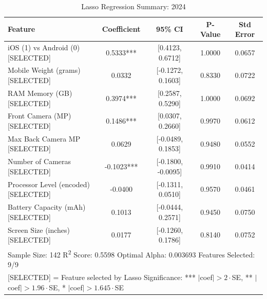 \documentclass[12pt]{article}
\begin{document}
\begin{table}[ht]
\centering
\caption{Lasso Regression Summary: 2024}
\begin{tabular}{lcccc}
\toprule
Feature & Coefficient & 95\% CI & P-Value & Std Error \\
\midrule
iOS (1) vs Android (0) [SELECTED] & 0.5333*** & {[0.4123, 0.6712]} & 1.0000 & 0.0657 \\
Mobile Weight (grams) [SELECTED] & 0.0332 & {[-0.1272, 0.1603]} & 0.8330 & 0.0722 \\
RAM Memory (GB) [SELECTED] & 0.3974*** & {[0.2587, 0.5290]} & 1.0000 & 0.0692 \\
Front Camera (MP) [SELECTED] & 0.1486*** & {[0.0307, 0.2660]} & 0.9970 & 0.0612 \\
Max Back Camera MP [SELECTED] & 0.0629 & {[-0.0489, 0.1853]} & 0.9480 & 0.0552 \\
Number of Cameras [SELECTED] & -0.1023*** & {[-0.1800, -0.0095]} & 0.9910 & 0.0414 \\
Processor Level (encoded) [SELECTED] & -0.0400 & {[-0.1311, 0.0510]} & 0.9570 & 0.0461 \\
Battery Capacity (mAh) [SELECTED] & 0.1013 & {[-0.0444, 0.2571]} & 0.9450 & 0.0750 \\
Screen Size (inches) [SELECTED] & 0.0177 & {[-0.1260, 0.1786]} & 0.8140 & 0.0752 \\
\midrule
\multicolumn{5}{l}{\footnotesize Sample Size: 142 \quad R\textsuperscript{2} Score: 0.5598 \quad Optimal Alpha: 0.003693 \quad Features Selected: 9/9} \\
\multicolumn{5}{l}{\footnotesize [SELECTED] = Feature selected by Lasso \quad Significance: *** $|$coef$|>2\cdot$SE, ** $|$coef$|>1.96\cdot$SE, * $|$coef$|>1.645\cdot$SE} \\
\bottomrule
\end{tabular}
\end{table}
\end{document}
